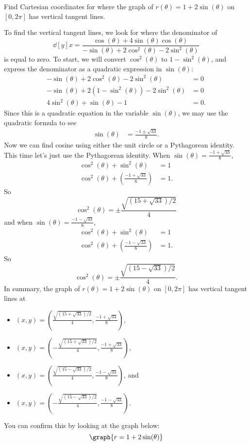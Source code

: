 \documentclass{ximera}
\begin{document}
  \begin{example}
    Find Cartesian coordinates for where the graph of $r(\theta)
    =1+2\sin(\theta)$ on $[0,2\pi]$ has vertical tangent lines.
    \begin{explanation}
    To find the vertical tangent lines, we look for where the
    denominator of
    \[
    \dd[y]{x}=\frac{\cos(\theta) + 4\sin(\theta)\cos(\theta)}{-\sin(\theta) + 2\cos^2(\theta)-2\sin^2(\theta)}
    \]
    is equal to zero. To start, we will convert $\cos^2(\theta)$ to
    $1-\sin^2(\theta)$, and express the denominator as a quadratic
    expression in $\sin(\theta)$:
  \begin{align*}
    -\sin(\theta) + 2\cos^2(\theta)-2\sin^2(\theta) &=0\\
    -\sin(\theta) + 2(1-\sin^2(\theta))-2\sin^2(\theta) &=0\\
    4\sin^2(\theta) + \sin(\theta) -1 &= 0.
  \end{align*}
  Since this is a quadratic equation in the variable $\sin(\theta)$,
  we may use the quadratic formula to see
  \begin{align*}
    \sin(\theta) &= \frac{-1\pm\sqrt{33}}{8}.
  \end{align*}
  Now we can find cosine using either the unit circle or a Pythagorean
  identity. This time let's just use the Pythagorean identity. When $\sin(\theta) =\frac{-1+\sqrt{33}}{8}$,
  \begin{align*}
    \cos^2(\theta) + \sin^2(\theta) &= 1\\
    \cos^2(\theta) + \left(\frac{-1+\sqrt{33}}{8}\right) &= 1.
  \end{align*}
  So
  \[
  \cos^2(\theta) = \pm \frac{\sqrt{(15+\sqrt{33})/2}}{4}
  \]
  and when $\sin(\theta) =\frac{-1-\sqrt{33}}{8}$,
  \begin{align*}
    \cos^2(\theta) + \sin^2(\theta) &= 1\\
    \cos^2(\theta) + \left(\frac{-1-\sqrt{33}}{8}\right) &= 1.
  \end{align*}
  So
  \[
  \cos^2(\theta) = \pm \frac{\sqrt{(15-\sqrt{33})/2}}{4}.
  \]
  In summary, the graph of $r(\theta) =1+2\sin(\theta)$ on $[0,2\pi]$
  has vertical tangent lines at
   \begin{itemize}
   \item $(x,y) = \left(\frac{\sqrt{(15+\sqrt{33})/2}}{4},\frac{-1+\sqrt{33}}{8}\right)$,
   \item $(x,y) = \left(-\frac{\sqrt{(15+\sqrt{33})/2}}{4},\frac{-1+\sqrt{33}}{8}\right)$,
   \item $(x,y) = \left(\frac{\sqrt{(15-\sqrt{33})/2}}{4},\frac{-1-\sqrt{33}}{8}\right)$, and 
   \item $(x,y) = \left(-\frac{\sqrt{(15-\sqrt{33})/2}}{4},\frac{-1-\sqrt{33}}{8}\right)$.
   \end{itemize}
   \begin{prompt}
     You can confirm this by looking at the graph below:
     \[
     \graph{r=1+2\sin(\theta)}
     \]
   \end{prompt}
  \end{explanation}
\end{example}
\end{document}

